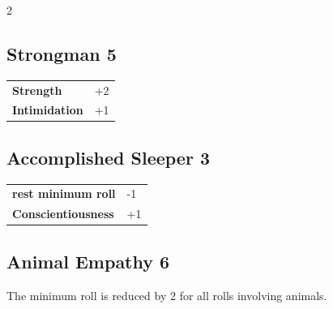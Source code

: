 \begin{multicols}{2}
\begin{tcolorbox}

\end{tcolorbox}

\begin{tcolorbox}
    \subsection*{Strongman \hfill \small{5 }}
    \tcblower




\begin{tabular}{@{}ll@{}}
    \textbf{Strength} & +2\\
    \textbf{Intimidation} & +1\\
\end{tabular}


\end{tcolorbox}

\begin{tcolorbox}
    \subsection*{Accomplished Sleeper \hfill \small{3 }}
    \tcblower




\begin{tabular}{@{}ll@{}}
    \textbf{rest minimum roll} & -1\\
    \textbf{Conscientiousness} & +1\\
\end{tabular}


\end{tcolorbox}

\begin{tcolorbox}
    \subsection*{Animal Empathy \hfill \small{6 }}
    \tcblower
The minimum roll is reduced by 2 for all rolls involving animals.



\end{tcolorbox}
\end{multicols}
